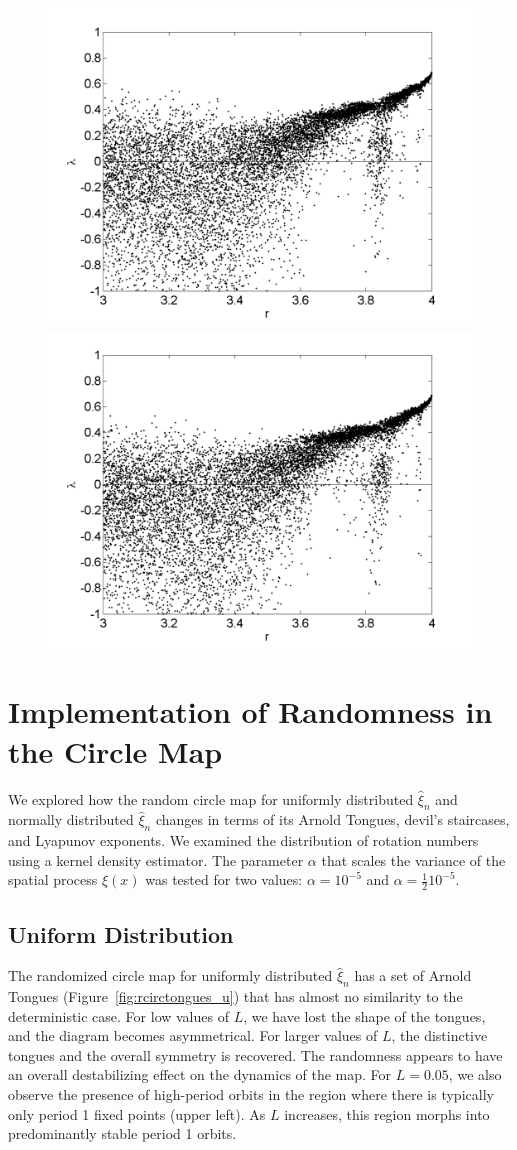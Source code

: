 \begin{figure}[!h]
\includegraphics[width=.5\textwidth]{figs/rlog_lyap_halfsig_L_08.png}\hfill
\includegraphics[width=.5\textwidth]{figs/rlog_lyap_halfsig_L_09.png}\\
\end{figure}

\section{Implementation of Randomness in the Circle Map}
We explored how the random circle map for uniformly distributed $\hat{\xi}_n$ and
normally distributed $\hat{\xi}_n$ changes in terms of its Arnold
Tongues, devil's staircases, and Lyapunov exponents. We examined the
distribution of rotation numbers using a kernel density
estimator. The parameter $\alpha$ that scales the variance of the
spatial process $\xi(x)$ was tested for two values: $\alpha=10^{-5}$
and $\alpha = \frac{1}{2}10^{-5}$.
\subsection{Uniform Distribution}
The randomized circle map for uniformly distributed $\hat{\xi}_n$ has a set of Arnold Tongues (Figure~\ref{fig:rcirctongues_u}) that has almost no similarity to the deterministic
case. For low values of $L$, we have lost the
shape of the tongues, and the diagram becomes asymmetrical. For larger
values of $L$, the distinctive tongues and the overall symmetry is
recovered. The randomness appears to have an overall destabilizing
effect on the dynamics of the map. For $L=0.05$, we also observe the
presence of high-period orbits in the region where there is typically
only period 1 fixed points (upper left). As $L$ increases, this region
morphs into predominantly stable period 1 orbits. 

